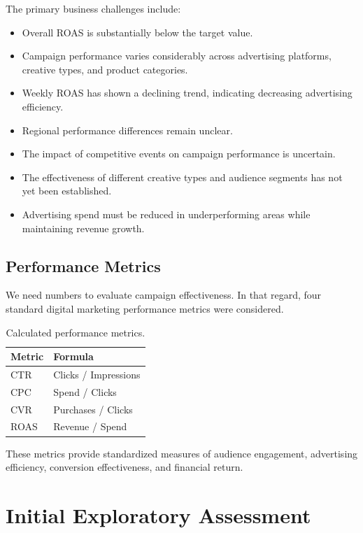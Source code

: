 The primary business challenges include:

\begin{itemize}
	\item Overall ROAS is substantially below the target value.
	\item Campaign performance varies considerably across advertising platforms, creative types, and product categories.
	\item Weekly ROAS has shown a declining trend, indicating decreasing advertising efficiency.
	\item Regional performance differences remain unclear.
	\item The impact of competitive events on campaign performance is uncertain.
	\item The effectiveness of different creative types and audience segments has not yet been established.
	\item Advertising spend must be reduced in underperforming areas while maintaining revenue growth.
\end{itemize}

\subsection{Performance Metrics}

We need numbers to evaluate campaign effectiveness. In that regard, four standard digital marketing performance metrics were considered.

\begin{table}[H]
	\centering
	\begin{tabular}{ll}
		\toprule
		Metric & Formula\\
		\midrule
		CTR & Clicks / Impressions\\
		CPC & Spend / Clicks\\
		CVR & Purchases / Clicks\\
		ROAS & Revenue / Spend\\
		\bottomrule
	\end{tabular}
	\caption{Calculated performance metrics.}
\end{table}

These metrics provide standardized measures of audience engagement, advertising efficiency, conversion effectiveness, and financial return.

\section{Initial Exploratory Assessment}

